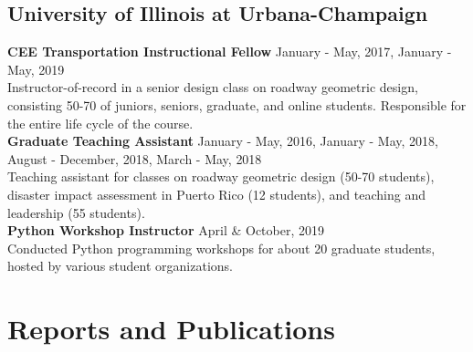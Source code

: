 \documentclass[12pt]{article}
\begin{document}
\subsection*{University of Illinois at Urbana-Champaign}
\textbf{CEE Transportation Instructional Fellow} \hfill January - May, 2017, January - May, 2019 \\
Instructor-of-record in a senior design class on roadway geometric design, consisting 50-70 of juniors, seniors, graduate, and online students. Responsible for the entire life cycle of the course. \\

\textbf{Graduate Teaching Assistant} \hfill January - May, 2016, January - May, 2018, August - December, 2018, March - May, 2018 \\
Teaching assistant for classes on roadway geometric design (50-70 students), disaster impact assessment in Puerto Rico (12 students), and teaching and leadership (55 students). \\

\textbf{Python Workshop Instructor} \hfill April \& October, 2019\\
Conducted Python programming workshops for about 20 graduate students, hosted by various student organizations. 


\bigskip
\section*{Reports and Publications}
\hfill
\end{document}
